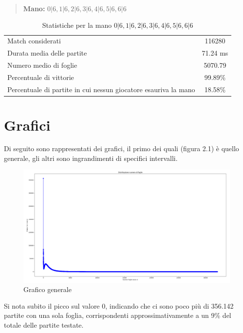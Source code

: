 \documentclass[a4paper,12pt]{report} %
\begin{document}
\begin{quote}
    \textbf{Mano:} \(0|6, 1|6, 2|6, 3|6, 4|6, 5|6, 6|6\)
\end{quote}

\begin{table}[h!]
    \centering
    \begin{tabular}{|l|c|}
        \hline
        Match considerati & 116280 \\
        Durata media delle partite &  71.24 ms \\
        Numero medio di foglie &  5070.79 \\
        Percentuale di vittorie & 99.89\% \\
        Percentuale di partite in cui nessun giocatore esauriva la mano &  18.58\% \\
        \hline
    \end{tabular}
    \caption{Statistiche per la mano \(0|6, 1|6, 2|6, 3|6, 4|6, 5|6, 6|6\)}
    \label{tab:stats_tutti_6}
\end{table}


\section{Grafici}

Di seguito sono rappresentati dei grafici, il primo dei quali (figura 2.1) è quello generale, gli altri sono ingrandimenti di specifici intervalli.


\begin{figure}[h!]
    \centering
    \includegraphics[width=1\textwidth]{imgs/grafico_base.png} %
    \caption{Grafico generale}
    \label{fig:etichetta}
\end{figure}

Si nota subito il picco sul valore 0, indicando che ci sono poco più di 356.142 partite con una sola foglia, corrispondenti approssimativamente a un 9\% del totale delle partite testate.
\end{document}
